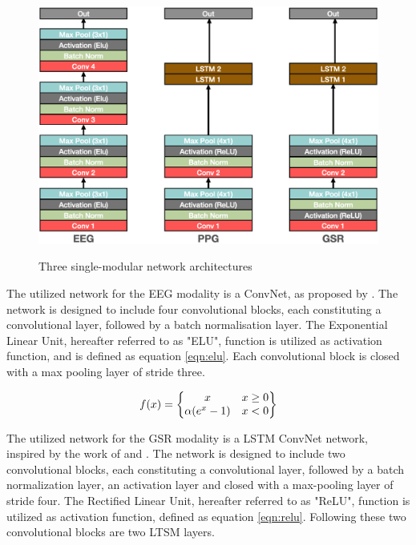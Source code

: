 \documentclass[12pt]{article}
\begin{document}
\begin{figure}
\caption{Three single-modular network architectures}
\bigskip
\includegraphics[scale=0.725]{single_model_architecture}
\label{fig:singlearchitecture}
\end{figure}

The utilized network for the EEG modality is a ConvNet, as proposed by . The network is designed to include four convolutional blocks, each constituting a convolutional layer, followed by a batch normalisation layer. The Exponential Linear Unit, hereafter referred to as "ELU", function is utilized as activation function, and is defined as equation \ref{eqn:elu}. Each convolutional block is closed with a max pooling layer of stride three.

\begin{equation}
\label{eqn:elu}
f(x)= 
\begin{Bmatrix}
x & x \geq0 \\ 
\alpha (e^x -1) & x<0
\end{Bmatrix}
\bigskip
\end{equation}

The utilized network for the GSR modality is a LSTM ConvNet network, inspired by the work of  and  . The network is designed to include two convolutional blocks, each constituting a convolutional layer, followed by a batch normalization layer, an activation layer and closed with a max-pooling layer of stride four. The Rectified Linear Unit, hereafter referred to as "ReLU", function is utilized as activation function, defined as equation \ref{eqn:relu}. Following these two convolutional blocks are two LTSM layers.
\end{document}
